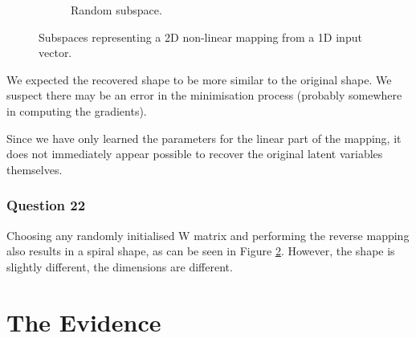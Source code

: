 \documentclass[10pt, a4paper, twocolumn]{article} %
\begin{document}
\begin{figure}[!htb]
\begin{subfigure}{.5\linewidth}
  \caption{Random subspace.}
  \label{fig:q22}
\end{subfigure}
\caption{Subspaces representing a 2D non-linear mapping from a 1D input vector. }
\end{figure}

We expected the recovered shape to be more similar to the original shape. We suspect there may be an error in the minimisation process (probably somewhere in computing the gradients).

Since we have only learned the parameters for the linear part of the mapping, it does not immediately appear possible to recover the original latent variables themselves.

\subsubsection*{Question 22}

Choosing any randomly initialised W matrix and performing the reverse mapping also results in a spiral shape, as can be seen in Figure \ref{fig:q22}. However, the shape is slightly different, the dimensions are different.


\section{The Evidence}


\printbibliography[title={Bibliography}] %

\end{document}
